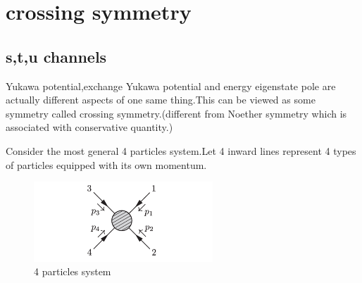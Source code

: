 \documentclass[a4paper]{article}
\begin{document}
\section{crossing symmetry}
\subsection{s,t,u channels}
Yukawa potential,exchange Yukawa potential and energy eigenstate pole are actually different aspects of one same thing.This can be viewed as some symmetry called crossing symmetry.(different from Noether symmetry which is associated with conservative quantity.)
\par Consider the most general 4 particles system.Let 4 inward lines represent 4 types of particles equipped with its own momentum.
\begin{figure}[htbp]
	\centering
	\includegraphics[width=0.6\textwidth]{11.png}
	\caption{4 particles system}
\end{figure}
\end{document}
